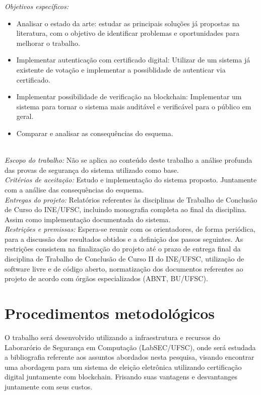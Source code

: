 \documentclass{ufsctex/ufsctex}
\begin{document}
\noindent \emph{Objetivos específicos: }
	\begin{itemize}
		\item Analisar o estado da arte: estudar as principais soluções
		já propostas na literatura, com o objetivo de identificar problemas
		e oportunidades para melhorar o trabalho.
		\item Implementar autenticação com certificado digital: Utilizar
		de um sistema já existente de votação e implementar a possiblidade
		de autenticar via certificado.
		\item Implementar possibilidade de verificação na blockchain:
		Implementar um sistema para tornar o sistema mais auditável e 
		verificável para o público em geral.
		\item Comparar e analisar as consequências do esquema.
	\end{itemize}
\\

\noindent \emph{Escopo do trabalho:} Não se aplica ao conteúdo deste trabalho
a análise profunda das provas de segurança do sistema utilizado como base.
\\

\noindent \emph{Critérios de aceitação:} Estudo e implementação do sistema
proposto. Juntamente com a análise das consequências do esquema.
\\

\noindent \emph{Entregas do projeto:} Relatórios referentes às disciplinas 
de Trabalho de Conclusão de Curso do INE/UFSC, incluindo monografia completa
ao final da disciplina. Assim como implementação documentada do sistema.
\\

\noindent \emph{Restrições e premissas:}  Espera-se reunir com os orientadores,
de forma periódica, para a discussão dos resultados obtidos e a definição dos
passos seguintes. As restrições consistem na finalização do projeto até o prazo
de entrega final da disciplina de Trabalho de Conclusão de Curso II do
INE/UFSC, utilização de software livre e de código aberto, normatização dos
documentos referentes ao projeto de acordo com órgãos especializados (ABNT,
BU/UFSC).

\section{Procedimentos metodológicos}

O trabalho será desenvolvido utilizando a infraestrutura e recursos do
Laborarório de Segurança em Computação (LabSEC/UFSC), onde será estudada
a bibliografia referente aos assuntos abordados nesta pesquisa, visando
encontrar uma abordagem para um sistema de eleição eletrônica utilizando
certificação digital juntamente com blockchain. Frisando suas vantagens e
desvantanges juntamente com seus custos.
\end{document}
